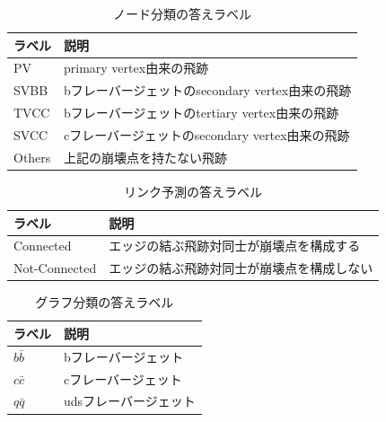 \begin{table}[H]
    \begin{center}
      \begin{tabular}{l l}
         \hline
	ラベル & 説明\\	
	\hline
	\hline
	PV & primary vertex由来の飛跡\\
	SVBB & bフレーバージェットのsecondary vertex由来の飛跡\\
	TVCC & bフレーバージェットのtertiary vertex由来の飛跡\\
	SVCC & cフレーバージェットのsecondary vertex由来の飛跡\\
	Others & 上記の崩壊点を持たない飛跡\\
	\hline
      \end{tabular}
    \end{center}
    \caption{ノード分類の答えラベル}
    \label{gnnoutput_n}
\end{table}
\begin{table}[H]
    \begin{center}
      \begin{tabular}{l l}
         \hline
	ラベル & 説明\\	
	\hline
	\hline
	Connected & エッジの結ぶ飛跡対同士が崩壊点を構成する\\
	Not-Connected & エッジの結ぶ飛跡対同士が崩壊点を構成しない\\
	\hline
      \end{tabular}
    \end{center}
    \caption{リンク予測の答えラベル}
    \label{gnnoutput_e}
\end{table}
\begin{table}[H]
    \begin{center}
      \begin{tabular}{l l}
         \hline
	ラベル & 説明\\	
	\hline
	\hline
	$b\bar{b}$ & bフレーバージェット\\
	$c\bar{c}$ & cフレーバージェット\\
	$q\bar{q}$ & udsフレーバージェット\\
	\hline
      \end{tabular}
    \end{center}
    \caption{グラフ分類の答えラベル}
  \label{gnnoutput_g}
\end{table}
